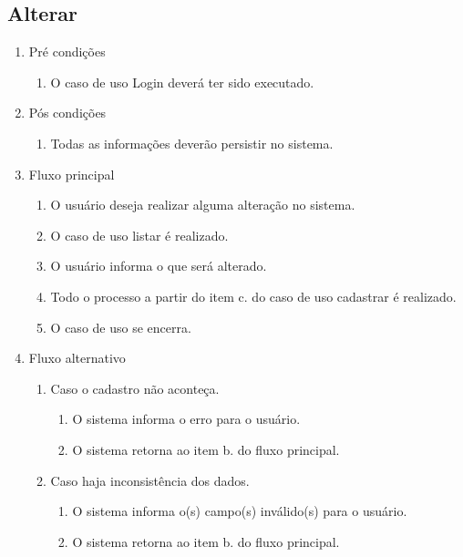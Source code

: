 \subsection{Alterar}
\begin{enumerate}
	\item Pré condições
	\begin{enumerate}
		\item O caso de uso Login deverá ter sido executado.
	\end{enumerate}
	\item Pós condições
	\begin{enumerate}
		\item Todas as informações deverão persistir no sistema.
	\end{enumerate}
	\item Fluxo principal
	\begin{enumerate}
		\item O usuário deseja realizar alguma alteração no sistema.
		\item O caso de uso listar é realizado.
		\item O usuário informa o que será alterado.
		\item Todo o processo a partir do item c. do caso de uso cadastrar é realizado.
		\item O caso de uso se encerra.
	\end{enumerate}
	\item Fluxo alternativo
	\begin{enumerate}
		\item Caso o cadastro não aconteça.
		\begin{enumerate}
			\item O sistema informa o erro para o usuário.
			\item O sistema retorna ao item b. do fluxo principal.
		\end{enumerate}
		\item Caso haja inconsistência dos dados.
		\begin{enumerate}
			\item O sistema informa o(s) campo(s) inválido(s) para o usuário.
			\item O sistema retorna ao item b. do fluxo principal.
		\end{enumerate}		
	\end{enumerate}
\end{enumerate}

